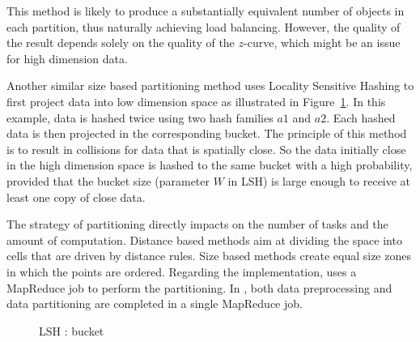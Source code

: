 \documentclass[10pt,journal,compsoc]{IEEEtran}
\begin{document}
This method is likely to produce a substantially equivalent number of objects in each partition, thus naturally 
achieving load balancing. However, the quality of the result depends solely on the quality of the $z$-curve, which 
might be an issue for high dimension data. 


 
Another similar size based partitioning method uses Locality Sensitive Hashing to first project data into low dimension 
space as illustrated in Figure~\ref{lsh_partition_figure}. In this example, data is hashed twice using two hash 
families $a1$ and $a2$. Each hashed data is then projected in the corresponding bucket. The principle of this method is 
to result in collisions for data that is spatially close. So the data initially close in the high dimension space is 
hashed to the same bucket with a high probability, provided that the bucket size (parameter $W$ in LSH) is large enough 
to receive at least one copy of close data. 

 
The strategy of partitioning directly impacts on the number of tasks and the amount of computation. Distance based 
methods aim at dividing the space into cells that are driven by distance rules. Size based methods create equal size 
zones in which the points are ordered.
Regarding the implementation, \cite{Lu:2012:EPK:2336664.2336674} uses a MapReduce job to 
perform the partitioning. In \cite{Zhang:2012:EPK:2247596.2247602}, both data preprocessing and data partitioning are completed in a single MapReduce job.

\begin{figure}[h]
\centering
{}
\caption{LSH : bucket \label{lsh_partition_figure}}
\end{figure} 
\end{document}
